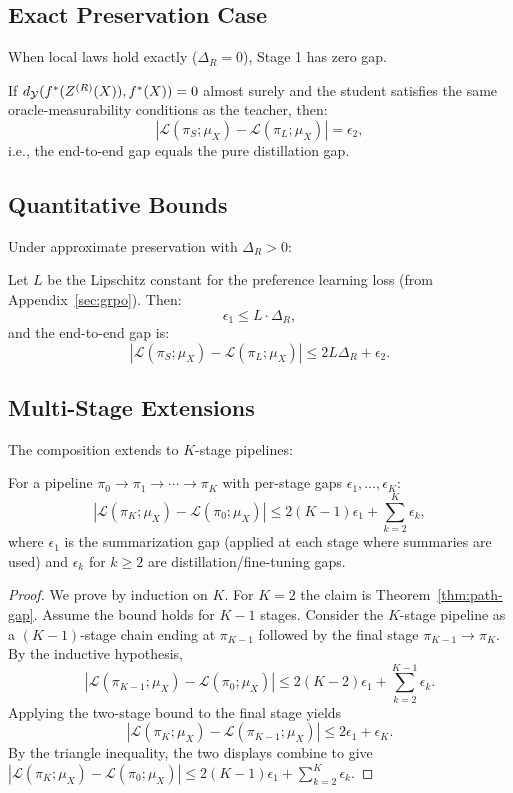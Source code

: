 \subsection{Exact Preservation Case}

When local laws hold exactly ($\Delta_R = 0$), Stage 1 has zero gap.

\begin{corollary}
If $d_{\mathcal{Y}}(f^{\ast}(Z^{(R)}(X)), f^{\ast}(X)) = 0$ almost surely and the student satisfies the same oracle-measurability conditions as the teacher, then:
\[
|\mathcal{L}(\pi_S; \mu_X) - \mathcal{L}(\pi_L; \mu_X)| = \epsilon_2,
\]
i.e., the end-to-end gap equals the pure distillation gap.
\end{corollary}

\subsection{Quantitative Bounds}

Under approximate preservation with $\Delta_R > 0$:

\begin{theorem}
Let $L$ be the Lipschitz constant for the preference learning loss (from Appendix~\ref{sec:grpo}). Then:
\[
\epsilon_1 \le L \cdot \Delta_R,
\]
and the end-to-end gap is:
\[
|\mathcal{L}(\pi_S; \mu_X) - \mathcal{L}(\pi_L; \mu_X)| \le 2 L \Delta_R + \epsilon_2.
\]
\end{theorem}

\subsection{Multi-Stage Extensions}

The composition extends to $K$-stage pipelines:

\begin{theorem}
For a pipeline $\pi_0 \to \pi_1 \to \cdots \to \pi_K$ with per-stage gaps $\epsilon_1, \ldots, \epsilon_K$:
\[
|\mathcal{L}(\pi_K; \mu_X) - \mathcal{L}(\pi_0; \mu_X)| \le 2(K-1)\epsilon_1 + \sum_{k=2}^K \epsilon_k,
\]
where $\epsilon_1$ is the summarization gap (applied at each stage where summaries are used) and $\epsilon_k$ for $k \ge 2$ are distillation/fine-tuning gaps.
\end{theorem}

\begin{proof}
We prove by induction on $K$. For $K=2$ the claim is Theorem~\ref{thm:path-gap}. Assume the bound holds for $K-1$ stages. Consider the $K$-stage pipeline as a $(K-1)$-stage chain ending at $\pi_{K-1}$ followed by the final stage $\pi_{K-1}\to\pi_K$. By the inductive hypothesis,
\[
|\mathcal{L}(\pi_{K-1}; \mu_X) - \mathcal{L}(\pi_0; \mu_X)|
\le 2(K-2)\epsilon_1 + \sum_{k=2}^{K-1} \epsilon_k.
\]
Applying the two-stage bound to the final stage yields
\[
|\mathcal{L}(\pi_K; \mu_X) - \mathcal{L}(\pi_{K-1}; \mu_X)|
\le 2\epsilon_1 + \epsilon_K.
\]
By the triangle inequality, the two displays combine to give
$|\mathcal{L}(\pi_K; \mu_X) - \mathcal{L}(\pi_0; \mu_X)|
\le 2(K-1)\epsilon_1 + \sum_{k=2}^K \epsilon_k$.
\end{proof}

